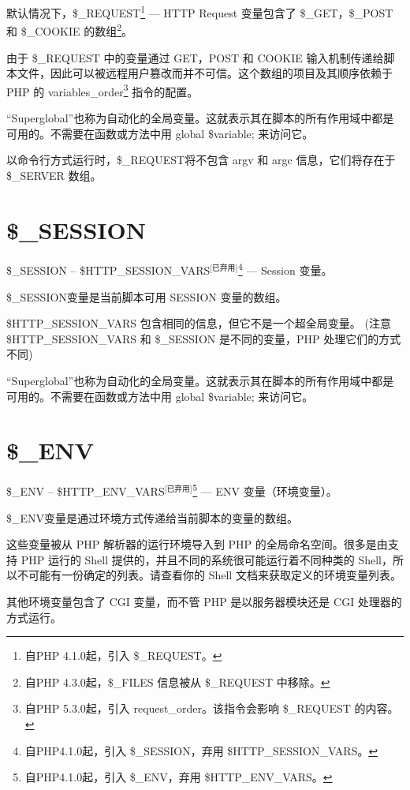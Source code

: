 默认情况下，\$\_REQUEST\footnote{自PHP 4.1.0起，引入 \$\_REQUEST。} — HTTP Request 变量包含了 \$\_GET，\$\_POST 和 \$\_COOKIE 的数组\footnote{自PHP 4.3.0起，\$\_FILES 信息被从 \$\_REQUEST 中移除。}。

由于 \$\_REQUEST 中的变量通过 GET，POST 和 COOKIE 输入机制传递给脚本文件，因此可以被远程用户篡改而并不可信。这个数组的项目及其顺序依赖于 PHP 的 variables\_order\footnote{自PHP 5.3.0起，引入 request\_order。该指令会影响 \$\_REQUEST 的内容。} 指令的配置。

“Superglobal”也称为自动化的全局变量。这就表示其在脚本的所有作用域中都是可用的。不需要在函数或方法中用 global \$variable; 来访问它。

以命令行方式运行时，\$\_REQUEST将不包含 argv 和 argc 信息，它们将存在于 \$\_SERVER 数组。




\section{\$\_SESSION}


\$\_SESSION -- \$HTTP\_SESSION\_VARS$^{\text{[已弃用]}}$\footnote{自PHP4.1.0起，引入 \$\_SESSION，弃用 \$HTTP\_SESSION\_VARS。} — Session 变量。


\$\_SESSION变量是当前脚本可用 SESSION 变量的数组。

\$HTTP\_SESSION\_VARS 包含相同的信息，但它不是一个超全局变量。 (注意 \$HTTP\_SESSION\_VARS 和 \$\_SESSION 是不同的变量，PHP 处理它们的方式不同)

“Superglobal”也称为自动化的全局变量。这就表示其在脚本的所有作用域中都是可用的。不需要在函数或方法中用 global \$variable; 来访问它。





\section{\$\_ENV}


\$\_ENV -- \$HTTP\_ENV\_VARS$^{\text{[已弃用]}}$\footnote{自PHP4.1.0起，引入 \$\_ENV，弃用 \$HTTP\_ENV\_VARS。} — ENV 变量（环境变量）。


\$\_ENV变量是通过环境方式传递给当前脚本的变量的数组。

这些变量被从 PHP 解析器的运行环境导入到 PHP 的全局命名空间。很多是由支持 PHP 运行的 Shell 提供的，并且不同的系统很可能运行着不同种类的 Shell，所以不可能有一份确定的列表。请查看你的 Shell 文档来获取定义的环境变量列表。

其他环境变量包含了 CGI 变量，而不管 PHP 是以服务器模块还是 CGI 处理器的方式运行。

